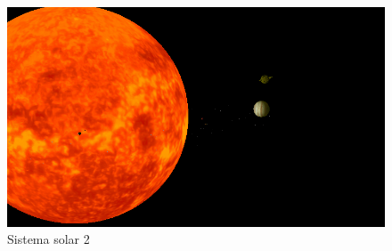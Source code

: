 \documentclass[relatorio.tex]{subfiles}
\begin{document}
\begin{landscape}
    \begin{figure}
        \centering
        \includegraphics[width=\linewidth]{assets/sis_solar2.png}
        \caption{Sistema solar 2} \label{fig:sistema_solar_2}
    \end{figure}
\end{landscape}
\end{document}
